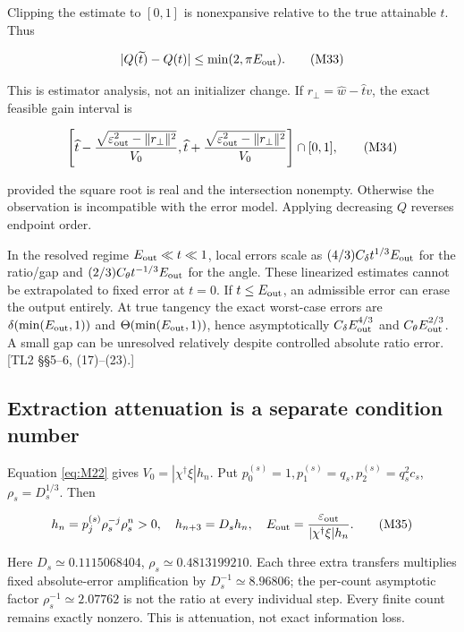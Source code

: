\documentclass[11pt,a4paper]{article}
\begin{document}
Clipping the estimate to \([0,1]\) is nonexpansive relative to the true attainable \(t\). Thus

\[
|Q(\widetilde t)-Q(t)|\le\min(2,\pi E_{\rm out}).
\tag{M33}\label{eq:M33}
\]

This is estimator analysis, not an initializer change. If \(r_\perp=\widehat w-\widehat t v\), the exact feasible gain interval is

\[
\left[\widehat t-\frac{\sqrt{\varepsilon_{\rm out}^2-\|r_\perp\|^2}}{V_0},
\widehat t+\frac{\sqrt{\varepsilon_{\rm out}^2-\|r_\perp\|^2}}{V_0}\right]\cap[0,1],
\tag{M34}\label{eq:M34}
\]

provided the square root is real and the intersection nonempty. Otherwise the observation is incompatible with the error model. Applying decreasing \(Q\) reverses endpoint order.

In the resolved regime \(E_{\rm out}\ll t\ll1\), local errors scale as \((4/3)C_\delta t^{1/3}E_{\rm out}\) for the ratio/\allowbreak{}gap and \((2/3)C_\theta t^{-1/3}E_{\rm out}\) for the angle. These linearized estimates cannot be extrapolated to fixed error at \(t=0\). If \(t\le E_{\rm out}\), an admissible error can erase the output entirely. At true tangency the exact worst-case errors are \(\delta(\min(E_{\rm out},1))\) and \(\Theta(\min(E_{\rm out},1))\), hence asymptotically \(C_\delta E_{\rm out}^{4/3}\) and \(C_\theta E_{\rm out}^{2/3}\). A small gap can be unresolved relatively despite controlled absolute ratio error. [TL2 \S{}\S{}5--6, (17)--(23).]

\subsection{Extraction attenuation is a separate condition number}

Equation \eqref{eq:M22} gives \(V_0=|\chi^\dagger\xi|h_n\). Put \(p_0^{(s)}=1,p_1^{(s)}=q_s,p_2^{(s)}=q_s^2c_s\), \(\rho_s=D_s^{1/3}\). Then

\[
h_n=p_j^{(s)}\rho_s^{-j}\rho_s^n>0,\quad
h_{n+3}=D_sh_n,\quad
E_{\rm out}=\frac{\varepsilon_{\rm out}}{|\chi^\dagger\xi|h_n}.
\tag{M35}\label{eq:M35}
\]

Here \(D_s\simeq0.1115068404\), \(\rho_s\simeq0.4813199210\). Each three extra transfers multiplies fixed absolute-error amplification by \(D_s^{-1}\simeq8.96806\); the per-count asymptotic factor \(\rho_s^{-1}\simeq2.07762\) is not the ratio at every individual step. Every finite count remains exactly nonzero. This is attenuation, not exact information loss.
\end{document}
